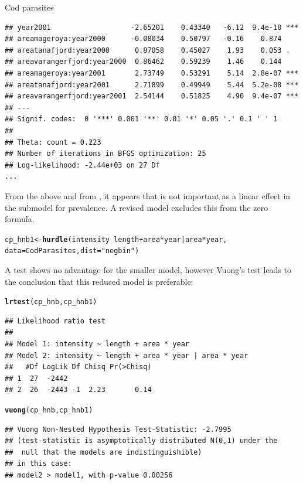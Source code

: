 \documentclass[11pt]{book}\usepackage[]{graphicx}\usepackage[]{color}
\makeatletter
\newcommand{\hlstr}[1]{\textcolor[rgb]{0.192,0.494,0.8}{#1}}%
\newcommand{\hlopt}[1]{\textcolor[rgb]{0,0,0}{#1}}%
\newcommand{\hlstd}[1]{\textcolor[rgb]{0.345,0.345,0.345}{#1}}%
\newcommand{\hlkwb}[1]{\textcolor[rgb]{0.69,0.353,0.396}{#1}}%
\newcommand{\hlkwc}[1]{\textcolor[rgb]{0.333,0.667,0.333}{#1}}%
\newcommand{\hlkwd}[1]{\textcolor[rgb]{0.737,0.353,0.396}{\textbf{#1}}}%
\newenvironment{kframe}{%
 \def\at@end@of@kframe{}%
 \ifinner\ifhmode%
  \def\at@end@of@kframe{\end{minipage}}%
  \begin{minipage}{\columnwidth}%
 \fi\fi%
 \def\FrameCommand##1{\hskip\@totalleftmargin \hskip-\fboxsep
 \colorbox{shadecolor}{##1}\hskip-\fboxsep
     \hskip-\linewidth \hskip-\@totalleftmargin \hskip\columnwidth}%
 \MakeFramed {\advance\hsize-\width
   \@totalleftmargin\z@ \linewidth\hsize
   \@setminipage}}%
 {\par\unskip\endMakeFramed%
 \at@end@of@kframe}
\newenvironment{knitrout}{}{} %
\renewenvironment{knitrout}{\small\renewcommand{\baselinestretch}{.85}}{} %
\makeatother
\begin{document}
\begin{Example}[cod2]{Cod parasites}
\begin{knitrout}
\begin{kframe}
\begin{verbatim}
## year2001                   -2.65201    0.43340   -6.12  9.4e-10 ***
## areamageroya:year2000      -0.08034    0.50797   -0.16    0.874    
## areatanafjord:year2000      0.87058    0.45027    1.93    0.053 .  
## areavarangerfjord:year2000  0.86462    0.59239    1.46    0.144    
## areamageroya:year2001       2.73749    0.53291    5.14  2.8e-07 ***
## areatanafjord:year2001      2.71899    0.49949    5.44  5.2e-08 ***
## areavarangerfjord:year2001  2.54144    0.51825    4.90  9.4e-07 ***
## ---
## Signif. codes:  0 '***' 0.001 '**' 0.01 '*' 0.05 '.' 0.1 ' ' 1 
## 
## Theta: count = 0.223
## Number of iterations in BFGS optimization: 25 
## Log-likelihood: -2.44e+03 on 27 Df
...
\end{verbatim}
\end{kframe}
\end{knitrout}
From the above and from , it appears that
 is not important as a linear effect in the submodel for
prevalence.  A revised model excludes this from the zero formula.

\begin{knitrout}
\color{fgcolor}\begin{kframe}
\begin{alltt}
\hlstd{cp_hnb1} \hlkwb{<-} \hlkwd{hurdle}\hlstd{(intensity} \hlopt{~} \hlstd{length} \hlopt{+} \hlstd{area} \hlopt{*} \hlstd{year} \hlopt{|} \hlstd{area}\hlopt{*}\hlstd{year,}
                  \hlkwc{data} \hlstd{= CodParasites,} \hlkwc{dist} \hlstd{=} \hlstr{"negbin"}\hlstd{)}
\end{alltt}
\end{kframe}
\end{knitrout}

A \LR test shows no advantage for the smaller model, however
Vuong's test leads to the conclusion that this reduced model is preferable:
\begin{knitrout}
\color{fgcolor}\begin{kframe}
\begin{alltt}
\hlkwd{lrtest}\hlstd{(cp_hnb, cp_hnb1)}
\end{alltt}
\begin{verbatim}
## Likelihood ratio test
## 
## Model 1: intensity ~ length + area * year
## Model 2: intensity ~ length + area * year | area * year
##   #Df LogLik Df Chisq Pr(>Chisq)
## 1  27  -2442                    
## 2  26  -2443 -1  2.23       0.14
\end{verbatim}
\begin{alltt}
\hlkwd{vuong}\hlstd{(cp_hnb, cp_hnb1)}
\end{alltt}
\begin{verbatim}
## Vuong Non-Nested Hypothesis Test-Statistic: -2.7995 
## (test-statistic is asymptotically distributed N(0,1) under the
##  null that the models are indistinguishible)
## in this case:
## model2 > model1, with p-value 0.00256
\end{verbatim}
\end{kframe}
\end{knitrout}



\end{Example}
\end{document}
